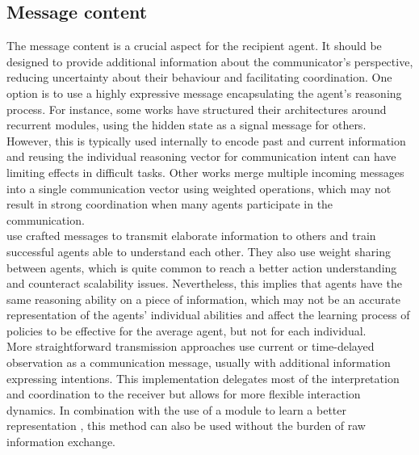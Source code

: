 \documentclass[a4paper,singleside,12pt]{report} %
\begin{document}
\subsection{Message content}\label{message-content}
The message content is a crucial aspect for the recipient agent. It should be designed to provide additional information about the communicator's perspective, reducing uncertainty about their behaviour and facilitating coordination. One option is to use a highly expressive message encapsulating the agent's reasoning process. For instance, some works \cite{Sukhbaatar2016LearningMC, Singh2018LearningWTIC3NET, Das2018TarMACTM, Peng2017MultiagentBN} have structured their architectures around recurrent modules, using the hidden state as a signal message for others. However, this is typically used internally to encode past and current information and reusing the individual reasoning vector for communication intent can have limiting effects in difficult tasks. Other works \cite{Sukhbaatar2016LearningMC, Singh2018LearningWTIC3NET} merge multiple incoming messages into a single communication vector using weighted operations, which may not result in strong coordination when many agents participate in the communication.\\
\cite{Das2018TarMACTM, ATOCJiang2018LearningAC} use crafted messages to transmit elaborate information to others and train successful agents able to understand each other. They also use weight sharing between agents, which is quite common \cite{Kim2021CommunicationIM, Das2018TarMACTM, Peng2017MultiagentBN, ATOCJiang2018LearningAC} to reach a better action understanding and counteract scalability issues. Nevertheless, this implies that agents have the same reasoning ability on a piece of information, which may not be an accurate representation of the agents' individual abilities and affect the learning process of policies to be effective for the average agent, but not for each individual.\\
More straightforward transmission approaches \cite{Liu2020When2comMP, Kim2021CommunicationIM} use current or time-delayed observation as a communication message, usually with additional information expressing intentions. This implementation delegates most of the interpretation and coordination to the receiver but allows for more flexible interaction dynamics. In combination with the use of a module to learn a better representation \cite{Lin2021LearningTG}, this method can also be used without the burden of raw information exchange.\\
\end{document}

